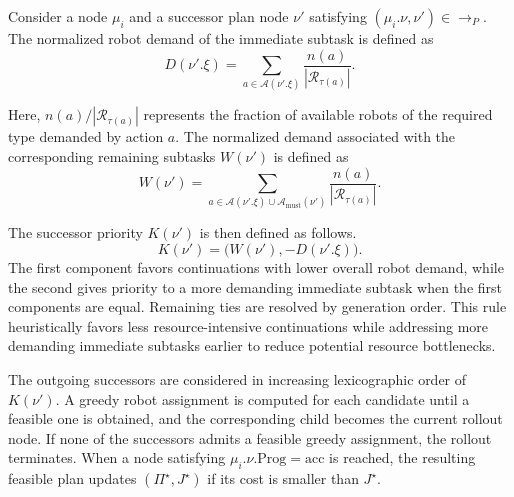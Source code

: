 \documentclass[lettersize,journal]{IEEEtran}
\theoremstyle{italiclemma}
\theoremstyle{italiclemma}
\theoremstyle{definition}
\begin{document}
Consider a node $\mu_i$ and a successor plan node
$\nu'$ satisfying $(\mu_i.\nu,\nu')\in\rightarrow_P$. The normalized robot demand of the immediate subtask is defined as
\begin{equation}
D(\nu'.\xi) =
\sum_{a\in\mathcal A(\nu'.\xi)}
\frac{n(a)}{|\mathcal R_{\tau(a)}|}.
\label{eq:rollout_immediate_demand}
\end{equation}

Here, $n(a)/|\mathcal R_{\tau(a)}|$ represents the fraction of available robots of the required type demanded by action $a$. The normalized demand associated with the corresponding remaining subtasks $W(\nu')$ is defined as
\begin{equation}
W(\nu')
=
\sum_{a\in
\mathcal A(\nu'.\xi)\cup\mathcal A_{\mathrm{must}}(\nu')}
\frac{n(a)}{|\mathcal R_{\tau(a)}|}.
\label{eq:rollout_total_demand}
\end{equation}

The successor priority $K(\nu')$ is then defined as follows.
\begin{equation}
K(\nu')
=
\bigl(W(\nu'),-D(\nu'.\xi)\bigr).
\end{equation}
The first component favors continuations with lower overall robot demand, while the second gives priority to a more demanding immediate subtask when the first components are equal. Remaining ties are resolved by generation order. This rule heuristically favors less resource-intensive continuations while addressing more demanding immediate subtasks earlier to reduce potential resource bottlenecks.

The outgoing successors are considered in increasing lexicographic order of $K(\nu')$. A greedy robot assignment is computed for each candidate until a feasible one is obtained, and the corresponding child becomes the current rollout node. If none of the successors
admits a feasible greedy assignment, the rollout terminates. When a node satisfying $\mu_i.\nu.\mathrm{Prog}=\mathrm{acc}$ is reached, the resulting feasible plan updates $(\Pi^\star,J^\star)$ if its cost is smaller than $J^\star$. 

\end{document}
